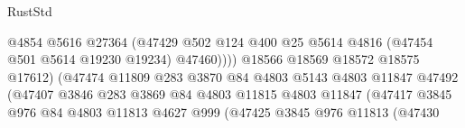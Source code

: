 \begin{lexlean}{RustStd}
\begin{coremodule}
                                                  @4854
                                                  @5616
                                                  @27364
                                                  (@47429
                                                    @502
                                                    @124
                                                    @400
                                                    @25
                                                    @5614
                                                    @4816
                                                    (@47454 @501 @5614 @19230 @19234)
                                                    @47460))))
                                            @18566
                                            @18569
                                            @18572
                                            @18575
                                            @17612)
                                          (@47474
                                            @11809
                                            @283
                                            @3870
                                            @84
                                            @4803
                                            @5143
                                            @4803
                                            @11847
                                            @47492
                                            (@47407
                                              @3846
                                              @283
                                              @3869
                                              @84
                                              @4803
                                              @11815
                                              @4803
                                              @11847
                                              (@47417
                                                @3845
                                                @976
                                                @84
                                                @4803
                                                @11813
                                                @4627
                                                @999
                                                (@47425
                                                  @3845
                                                  @976
                                                  @11813
                                                  (@47430

\end{coremodule}
\end{lexlean}
